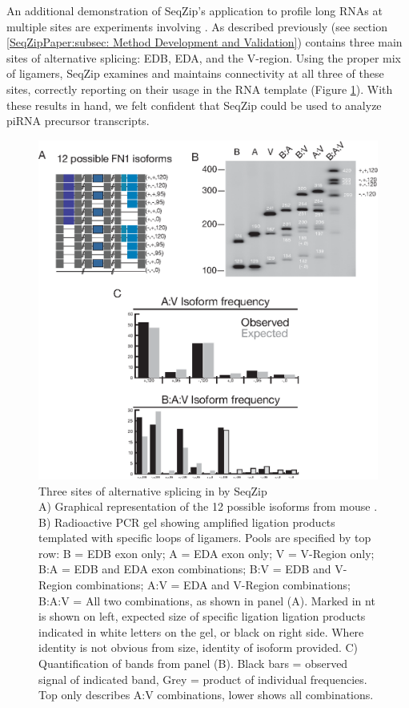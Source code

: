     An additional demonstration of SeqZip's application to profile long RNAs at multiple sites are experiments involving \fn{}. As described previously (see section \ref{SeqZipPaper:subsec: Method Development and Validation}) \fn{} contains three main sites of alternative splicing: EDB, EDA, and the V-region. Using the proper mix of ligamers, SeqZip examines and maintains connectivity at all three of these sites, correctly reporting on their usage in the RNA template (Figure \ref{SeqZipMethod:fig:Three Site FN1 by SeqZip}). With these results in hand, we felt confident that SeqZip could be used to analyze piRNA precursor transcripts.

    \begin{figure} %
            \centering 
            \includegraphics{Figures/SeqZipMethod/fn1ThreeSite.eps}
            \caption[Three sites of alternative splicing in \fn{} by SeqZip]
            {
              Three sites of alternative splicing in \fn{} by SeqZip\\[0.25cm]
              A) Graphical representation of the 12 possible isoforms from mouse \fn{}. B) Radioactive PCR gel showing amplified ligation products templated with specific loops of ligamers. Pools are specified by top row: B = EDB exon only; A = EDA exon only; V = V-Region only; B:A = EDB and EDA exon combinations; B:V = EDB and V-Region combinations; A:V = EDA and V-Region combinations; B:A:V = All two combinations, as shown in panel (A). Marked in nt is shown on left, expected size of specific ligation ligation products indicated in white letters on the gel, or black on right side. Where identity is not obvious from size, identity of isoform provided. C) Quantification of bands from panel (B). Black bars = observed signal of indicated band, Grey = product of individual frequencies. Top only describes A:V combinations, lower shows all combinations.
              }
            \label{SeqZipMethod:fig:Three Site FN1 by SeqZip}
            \end{figure}

